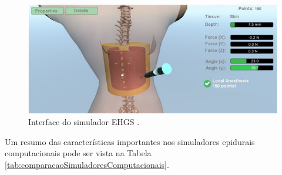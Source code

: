 \begin{figure}[ht!]
    \centering
    \includegraphics[width=0.8\linewidth]{capitulos/figuras/brasilSimulator.png} 
    \caption{Interface do simulador EHGS \cite{Brazil2017}.}
    \label{fig:brasilSimulator}
\end{figure}

Um resumo das características importantes nos simuladores epidurais computacionais pode ser vista na Tabela \ref{tab:comparacaoSimuladoresComputacionais}.

